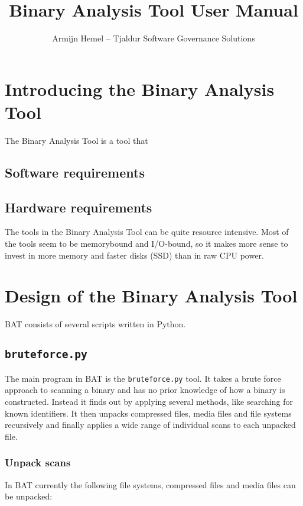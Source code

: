 \documentclass[10pt]{article}
\author{Armijn Hemel -- Tjaldur Software Governance Solutions}
\title{Binary Analysis Tool User Manual}
\begin{document}
\maketitle
\thispagestyle{empty}

\section{Introducing the Binary Analysis Tool}

The Binary Analysis Tool is a tool that 

\subsection{Software requirements}

\subsection{Hardware requirements}

The tools in the Binary Analysis Tool can be quite resource intensive. Most of
the tools seem to be memorybound and I/O-bound, so it makes more sense to
invest in more memory and faster disks (SSD) than in raw CPU power.

\section{Design of the Binary Analysis Tool}

BAT consists of several scripts written in Python.

\subsection{\texttt{bruteforce.py}}

The main program in BAT is the \texttt{bruteforce.py} tool. It takes a brute
force approach to scanning a binary and has no prior knowledge of how a binary
is constructed. Instead it finds out by applying several methods, like
searching for known identifiers. It then unpacks compressed files, media files
and file systems recursively and finally applies a wide range of individual
scans to each unpacked file.

\subsubsection{Unpack scans}

In BAT currently the following file systems, compressed files and media files
can be unpacked:
\end{document}
